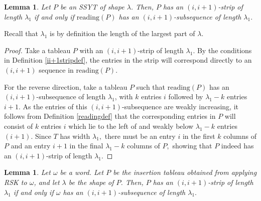 \documentclass[12pt]{amsart}
\newtheorem{lemma}[definition]{Lemma}
\begin{document}


\begin{lemma}\label{lemma:striptoreading}
Let $P$ be an SSYT of shape $\lambda$. Then, $P$ has an $(i,i+1)$-strip of length $\lambda_1$ if and only if $\text{reading}(P)$ has an $(i,i+1)$-subsequence of length $\lambda_1.$
\end{lemma}

Recall that $\lambda_1$ is by definition the length of the largest part of $\lambda$.

\begin{proof}
    Take a tableau $P$ with an $(i,i+1)$-strip of length $\lambda_1.$ By the conditions in  Definition \ref{ii+1stripdef}, the entries in the strip will correspond directly to an $(i,i+1)$ sequence in $\text{reading}(P).$
    
    For the reverse direction, take a tableau $P$ such that $\text{reading}(P)$ has an $(i,i+1)$-subsequence of length $\lambda_1$, with $k$ entries $i$ followed by $\lambda_1-k$ entries $i+1.$ As the entries of this $(i,i+1)$-subsequence are weakly increasing, it follows from Definition \ref{readingdef} that the corresponding entries in $P$ will consist of $k$ entries $i$ which lie to the left of and weakly below $\lambda_1-k$ entries $(i+1).$ Since $T$ has width $\lambda_1,$ there must be an entry $i$ in the first $k$ columns of $P$ and an entry $i+1$ in the final $\lambda_1-k$ columns of $P,$ showing that $P$ indeed has an $(i,i+1)$-strip of length $\lambda_1.$  
\end{proof}


\begin{lemma}\label{lemma:striptosequence}
Let $\omega$ be a word. Let $P$ be the insertion tableau obtained from applying RSK to $\omega$, and let $\lambda$ be the shape of $P$.
Then, $P$ has an $(i,i+1)$-strip of length $\lambda_1$ if and only if $\omega$ has an $(i,i+1)$-subsequence of length $\lambda_1.$
\end{lemma}
\end{document}
